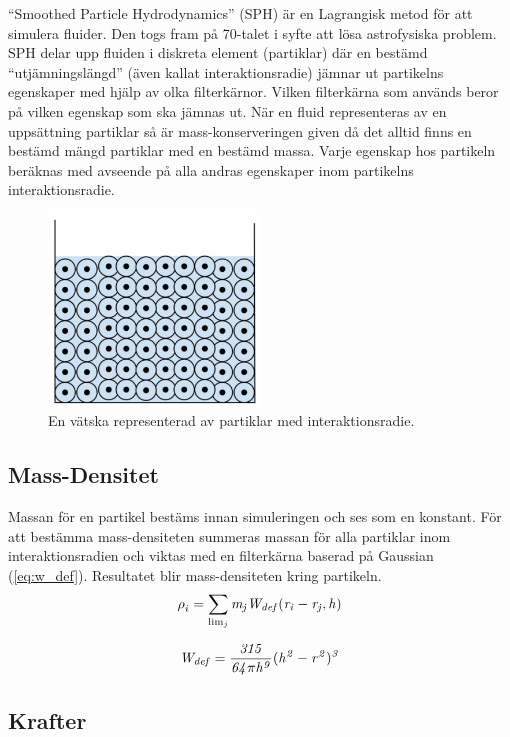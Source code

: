 \documentclass[a4paper,12pt,oneside,final]{extarticle}
\begin{document}
“Smoothed Particle Hydrodynamics” (SPH)\cite{sph} är en Lagrangisk metod för att simulera fluider.
Den togs fram på 70-talet i syfte att lösa astrofysiska problem.
SPH delar upp fluiden i diskreta element (partiklar) där en bestämd “utjämningslängd” (även kallat interaktionsradie) jämnar ut partikelns egenskaper med hjälp av olka filterkärnor.
Vilken filterkärna som används beror på vilken egenskap som ska jämnas ut.
När en fluid representeras av en uppsättning partiklar så är mass-konserveringen given då det alltid finns en bestämd mängd partiklar med en bestämd massa.
Varje egenskap hos partikeln beräknas med avseende på alla andras egenskaper inom partikelns interaktionsradie.
\begin{figure}[H]
  \centering
    \includegraphics[width=0.5\textwidth]{bilder/partiklar_vila}
  \caption{En vätska representerad av partiklar med interaktionsradie.}
\end{figure}

\subsection{Mass-Densitet}
Massan för en partikel bestäms innan simuleringen och ses som en konstant.
För att bestämma mass-densiteten summeras massan för alla partiklar inom interaktionsradien och viktas med en filterkärna baserad på Gaussian (\ref{eq:w_def}).
Resultatet blir mass-densiteten kring partikeln.
\begin{equation}
\rho^{}_{i} = \sum_{\lim_{j}} {\it m_j W_{def} (r_i-r_j,h)}
\end{equation}

\begin{equation} \label{eq:w_def}
{\it W_{def} = \frac{315}{64 \pi h^9}(h^2-r^2)^3}
\end{equation}

\subsection{Krafter}
\end{document}
